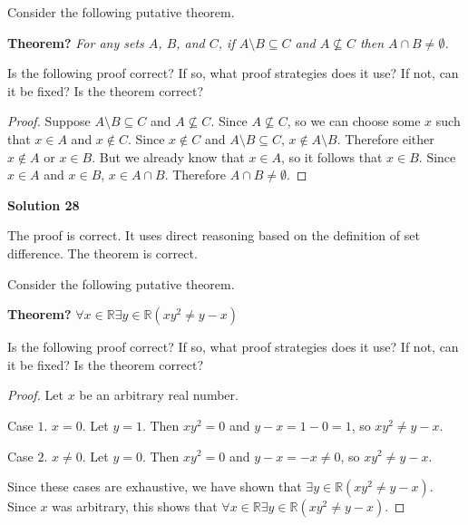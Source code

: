 \begin{tcolorbox}[title=Problem 28, breakable]
    Consider the following putative theorem.

    \textbf{Theorem?} \emph{For any sets $A$, $B$, and $C$, if $A \setminus B \subseteq C$
        and $A \not \subseteq C$ then $A \cap B \not = \emptyset$.}

    Is the following proof correct? If so, what proof strategies does it use? If
    not, can it be fixed? Is the theorem correct?

    \begin{proof}
        Suppose $A \setminus B \subseteq C$ and $A \not \subseteq C$. Since $A \not \subseteq C$,
        so we can choose some $x$ such that $x \in A$ and $x \not \in C$. Since $x \not \in C$
        and $A \setminus B \subseteq C$, $x \not \in A \setminus B$. Therefore either 
        $x \not \in A$ or $x \in B$. But we already know that $x \in A$, so it follows 
        that $x \in B$. Since $x \in A$ and $x \in B$, $x \in A \cap B$.
        Therefore $A \cap B \not = \emptyset$.
    \end{proof}
\end{tcolorbox}

\textbf{Solution 28}

The proof is correct. It uses direct reasoning based on the definition of set
difference. The theorem is correct.

\begin{tcolorbox}[title=Problem 29, breakable]
    Consider the following putative theorem.

    \textbf{Theorem?} \emph{$\forall{x \in \mathbb{R} \exists{y \in \mathbb{R}}(xy^2 \not = y - x)}$}

    Is the following proof correct? If so, what proof strategies does it use? If
    not, can it be fixed? Is the theorem correct?

    \begin{proof}
        Let $x$ be an arbitrary real number.

        Case $1$. $x = 0$. Let $y = 1$. Then $xy^2 = 0$ and $y - x = 1 - 0 = 1$, so
        $xy^2 \not = y - x$.

        Case $2$. $x \not = 0$. Let $y = 0$. Then $xy^2 = 0$ and $y - x = -x \not = 0$,
        so $xy^2 \not = y - x$.

        Since these cases are exhaustive, we have shown that $\exists{y \in
                \mathbb{R}}(xy^2 \not = y - x)$. Since $x$ was arbitrary, this shows that
        $\forall{x \in \mathbb{R}}\exists{y \in \mathbb{R}}(xy^2 \not = y - x)$.
    \end{proof}
\end{tcolorbox}

